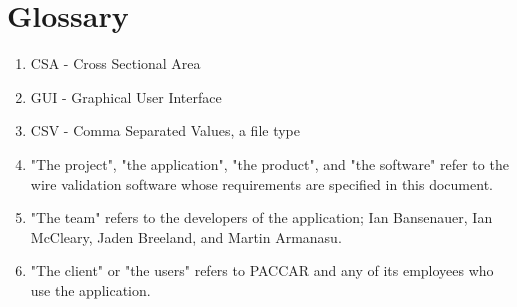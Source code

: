 \section{Glossary}
\begin{enumerate}
 \item CSA - Cross Sectional Area

 \item GUI - Graphical User Interface
 
 \item CSV - Comma Separated Values, a file type

\item "The project", "the application", "the product", and "the software" refer to the wire validation software whose requirements are specified in this document.

\item "The team" refers to the developers of the application; Ian Bansenauer, Ian McCleary, Jaden Breeland, and Martin Armanasu.

\item "The client" or "the users" refers to PACCAR and any of its employees who use the application.
 
 
\end{enumerate}
